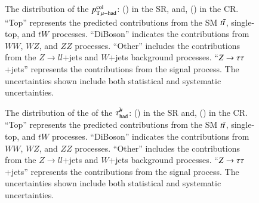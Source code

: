         \begin{figure}[htbp]
            \centering
            \caption{
                The distribution of the $p_{\mathrm{T}\,\mu\mathrm{-}\mathrm{had}}^\mathrm{col}$: (\protect{}) in the SR, and,
                (\protect{}) in the CR. 
                ``Top'' represents the predicted contributions from the SM $t\bar{t}$, single-top, and $tW$ processes. 
                ``DiBoson'' indicates the contributions from $WW$, $WZ$, and $ZZ$ processes. 
                ``Other'' includes the contributions from the $Z\rightarrow ll$+jets and $W$+jets background processes. 
                ``$Z \rightarrow \tau\tau$+jets'' represents the contributions from the signal process.
                The uncertainties shown include both statistical and systematic uncertainties.
            }
            \label{fig:murm:pt_col}
        \end{figure}

        \begin{figure}[htbp]
            \centering
            \caption{
                The distribution of the \pt of the $\tau_\mathrm{had}^{\mu\mkern-10mu\backslash}$: (\protect{}) in the SR  and,
                (\protect{}) in the CR. 
                ``Top'' represents the predicted contributions from the SM $t\bar{t}$, single-top, and $tW$ processes. 
                ``DiBoson'' indicates the contributions from $WW$, $WZ$, and $ZZ$ processes. 
                ``Other'' includes the contributions from the $Z\rightarrow ll$+jets and $W$+jets background processes. 
                ``$Z \rightarrow \tau\tau$+jets'' represents the contributions from the signal process.
                The uncertainties shown include both statistical and systematic uncertainties.
            }
            \label{fig:murm:pt_tau}
        \end{figure}


